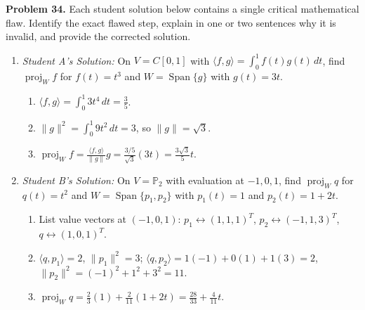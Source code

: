 \documentclass[11pt, letterpaper]{article}
\theoremstyle{definition}
\theoremstyle{remark}
\begin{document}
\textbf{Problem 34.} Each student solution below contains a single critical mathematical flaw. Identify the exact flawed step, explain in one or two sentences why it is invalid, and provide the corrected solution.
\begin{enumerate}[label=(\alph*)]
    \item \emph{Student A's Solution:} On $V = C[0, 1]$ with $\langle f, g \rangle = \int_0^1 f(t)g(t)\,dt$, find $\operatorname{proj}_W f$ for $f(t) = t^3$ and $W = \operatorname{Span}\{g\}$ with $g(t) = 3t$.
    \begin{enumerate}[label=Step \arabic*:]
        \item $\langle f, g \rangle = \int_0^1 3t^4\,dt = \frac{3}{5}$.
        \item $\|g\|^2 = \int_0^1 9t^2\,dt = 3$, so $\|g\| = \sqrt{3}$.
        \item $\operatorname{proj}_W f = \frac{\langle f, g \rangle}{\|g\|} g = \frac{3/5}{\sqrt{3}}(3t) = \frac{3\sqrt{3}}{5}t$.
    \end{enumerate}
    \item \emph{Student B's Solution:} On $V = \mathbb{P}_2$ with evaluation at $-1, 0, 1$, find $\operatorname{proj}_W q$ for $q(t) = t^2$ and $W = \operatorname{Span}\{p_1, p_2\}$ with $p_1(t) = 1$ and $p_2(t) = 1 + 2t$.
    \begin{enumerate}[label=Step \arabic*:]
        \item List value vectors at $(-1, 0, 1)$: $p_1 \leftrightarrow (1, 1, 1)^T$, $p_2 \leftrightarrow (-1, 1, 3)^T$, $q \leftrightarrow (1, 0, 1)^T$.
        \item $\langle q, p_1 \rangle = 2$, $\|p_1\|^2 = 3$; $\langle q, p_2 \rangle = 1(-1) + 0(1) + 1(3) = 2$, $\|p_2\|^2 = (-1)^2 + 1^2 + 3^2 = 11$.
        \item $\operatorname{proj}_W q = \frac{2}{3}(1) + \frac{2}{11}(1 + 2t) = \frac{28}{33} + \frac{4}{11}t$.
    \end{enumerate}
\end{enumerate}
\end{document}
